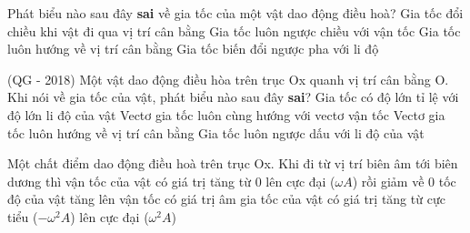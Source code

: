 \begin{ex}%
Phát biểu nào sau đây \textbf{sai} về gia tốc của một vật dao động điều hoà?
\choice
{Gia tốc đổi chiều khi vật đi qua vị trí cân bằng}
{\True Gia tốc luôn ngược chiều với vận tốc}
{Gia tốc luôn hướng về vị trí cân bằng}
{Gia tốc biến đổi ngược pha với li độ}
\end{ex} 
\begin{ex}%
(QG - 2018) Một vật dao động điều hòa trên trục Ox quanh vị trí cân bằng O. Khi nói về gia tốc của vật, phát biểu nào sau đây \textbf{sai}?
\choice
{Gia tốc có độ lớn tỉ lệ với độ lớn li độ của vật}
{\True Vectơ gia tốc luôn cùng hướng với vectơ vận tốc}
{Vectơ gia tốc luôn hướng về vị trí cân bằng}
{Gia tốc luôn ngược dấu với li độ của vật}
\end{ex}  
\begin{ex}%
Một chất điểm dao động điều hoà trên trục Ox. Khi đi từ vị trí biên âm tới biên dương thì
\choice
{\True vận tốc của vật có giá trị tăng từ 0 lên cực đại ($\omega A$) rồi giảm về 0}
{tốc độ của vật tăng lên}
{vận tốc có giá trị âm}
{gia tốc của vật có giá trị tăng từ cực tiểu ($- \omega^2A$) lên cực đại ($\omega^2A$)}
\end{ex} 

